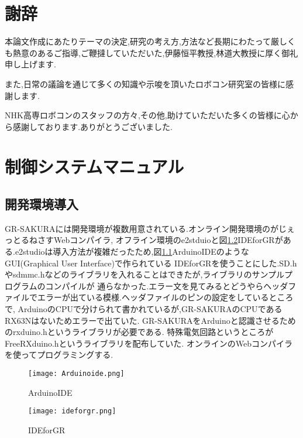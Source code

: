 \documentclass[12pt,oneside]{paper}
\begin{document}
\chapter*{謝辞}

本論文作成にあたりテーマの決定,研究の考え方,方法など長期にわたって厳しくも熱意のあるご指導,ご鞭撻していただいた,伊藤恒平教授,林道大教授に厚く御礼申し上げます.


また,日常の議論を通じて多くの知識や示唆を頂いたロボコン研究室の皆様に感謝します.


NHK高専ロボコンのスタッフの方々,その他,助けていただいた多くの皆様に心から感謝しております.ありがとうございました.

\appendix
\chapter{制御システムマニュアル}

\section{開発環境導入}
GR-SAKURAには開発環境が複数用意されている.オンライン開発環境のがじぇっとるねさすWebコンパイラ,
オフライン環境のe2stduioと図\ref{fig:idegr}IDEforGRがある.e2studioは導入方法が複雑だったため,図\ref{fig:ide}ArduinoIDEのようなGUI(Graphical User Interface)で作られている
IDEforGRを使うことにした.SD.hやsdmmc.hなどのライブラリを入れることはできたが,ライブラリのサンプルプログラムのコンパイルが
通らなかった.エラー文を見てみるとどうやらヘッダファイルでエラーが出ている模様.ヘッダファイルのピンの設定をしているところで,
ArduinoのCPUで分けられて書かれているが,GR-SAKURAのCPUであるRX63Nはないためエラーで出ていた.
GR-SAKURAをArduinoと認識させるためのrxduino.hというライブラリが必要である.
特殊電気回路というところがFreeRXduino.hというライブラリを配布していた.
オンラインのWebコンパイラを使ってプログラミングする.

\begin{figure}[H]
 \begin{center}
  \texttt{[image: Arduinoide.png]}
 \end{center}
 \caption{ArduinoIDE}
 \label{fig:ide}
\end{figure}


\begin{figure}[H]
 \begin{center}
  \texttt{[image: ideforgr.png]}
 \end{center}
 \caption{IDEforGR}
 \label{fig:idegr}
\end{figure}
\end{document}
